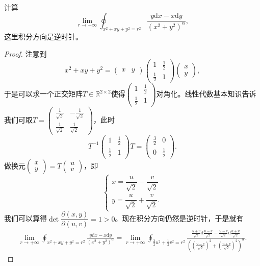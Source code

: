 \documentclass[../../main.tex]{subfiles}%
\begin{document}
\begin{example}
计算
\[
\lim_{r\to+\infty}\oint_{x^2+xy+y^2=r^2}\frac{y\mathrm{d}x-x\mathrm{d}y}{(x^2+y^2)^\alpha},
\]
这里积分方向是逆时针。
\end{example}
\begin{proof}

注意到
\[
x^2+xy+y^2=\begin{pmatrix}x & y\end{pmatrix}\begin{pmatrix}1 & \frac12\\[4pt]\frac12 & 1\end{pmatrix}\begin{pmatrix}x\\y\end{pmatrix},
\]
于是可以求一个正交矩阵$T\in\mathbb{R}^{2\times2}$使得$\begin{pmatrix}1 & \frac12\\\frac12 & 1\end{pmatrix}$对角化。线性代数基本知识告诉我们可取$T=\begin{pmatrix}\frac1{\sqrt2} & -\frac1{\sqrt2}\\[4pt]\frac1{\sqrt2} & \frac1{\sqrt2}\end{pmatrix}$，此时
\[
T^{-1}\begin{pmatrix}1 & \frac12\\\frac12 & 1\end{pmatrix}T=\begin{pmatrix}\frac32 & 0\\0 & \frac12\end{pmatrix}.
\]
做换元$\begin{pmatrix}x\\y\end{pmatrix}=T\begin{pmatrix}u\\v\end{pmatrix}$，即
\[
\begin{cases}
x=\dfrac{u}{\sqrt2}-\dfrac{v}{\sqrt2}\\[4pt]
y=\dfrac{u}{\sqrt2}+\dfrac{v}{\sqrt2}.
\end{cases}
\]
我们可以算得$\det \dfrac{\partial(x,y)}{\partial(u,v)}=1>0$。现在积分方向仍然是逆时针，于是就有
\begin{align*}
\lim_{r\to+\infty}\oint_{x^2+xy+y^2=r^2}\frac{y\mathrm{d}x-x\mathrm{d}y}{(x^2+y^2)^\alpha}
=\lim_{r\to+\infty}\oint_{\frac32u^2+\frac12v^2=r^2}\frac{\frac{u+v}{\sqrt2}\mathrm{d}\frac{u-v}{\sqrt2}-\frac{u-v}{\sqrt2}\mathrm{d}\frac{u+v}{\sqrt2}}{\left(\left(\frac{u-v}{\sqrt2}\right)^2+\left(\frac{u+v}{\sqrt2}\right)^2\right)^\alpha}.

\end{align*}
\end{proof}
\end{document}
